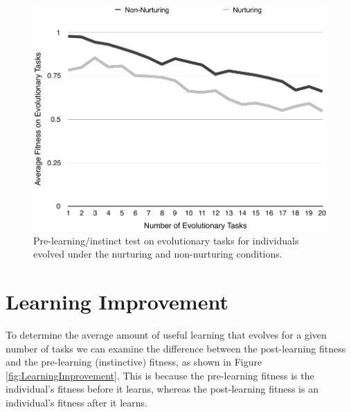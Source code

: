 \documentclass[master]{outhesis}
\begin{document}
\begin{figure}[H]
	\centering
	\includegraphics{NetworkTestPlot.pdf}
	\caption{Pre-learning/instinct test on evolutionary tasks for individuals evolved under the nurturing and non-nurturing conditions.}
\end{figure}

\section{Learning Improvement}

To determine the average amount of useful learning that evolves for a given number of tasks we can examine the difference between the post-learning fitness and the pre-learning (instinctive) fitness, as shown in Figure \ref{fig:LearningImprovement}.
This is because the pre-learning fitness is the individual's fitness before it learns, whereas the post-learning fitness is an individual's fitness after it learns.
\end{document}
